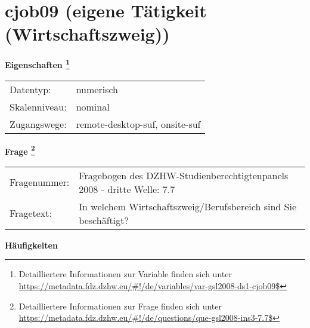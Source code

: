 
    \setcounter{footnote}{0}

    \vspace*{-1.8cm}
	\section{cjob09 (eigene Tätigkeit (Wirtschaftszweig))}
	\label{section:cjob09}



    \vspace*{0.5cm}
    \noindent\textbf{Eigenschaften
	\footnote{Detailliertere Informationen zur Variable finden sich unter
		\url{https://metadata.fdz.dzhw.eu/\#!/de/variables/var-gsl2008-ds1-cjob09$}}}\\
	\begin{tabularx}{\hsize}{@{}lX}
	Datentyp: & numerisch \\
	Skalenniveau: & nominal \\
	Zugangswege: &
	  remote-desktop-suf, 
	  onsite-suf
 \\
    \end{tabularx}



				\vspace*{0.5cm}
                \noindent\textbf{Frage
	                \footnote{Detailliertere Informationen zur Frage finden sich unter
		              \url{https://metadata.fdz.dzhw.eu/\#!/de/questions/que-gsl2008-ins3-7.7$}}}\\
				\begin{tabularx}{\hsize}{@{}lX}
					Fragenummer: &
					  Fragebogen des DZHW-Studienberechtigtenpanels 2008 - dritte Welle:
					  7.7
 \\
					Fragetext: & In welchem Wirtschaftszweig/Berufsbereich sind Sie beschäftigt? \\
				\end{tabularx}





        		\vspace*{0.5cm}
                \noindent\textbf{Häufigkeiten}

